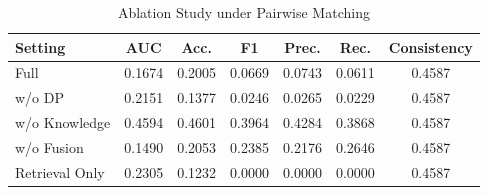 \begin{table}[t]
\centering
\small
\caption{Ablation Study under Pairwise Matching}
\label{tab:ablation_results}
\begin{tabular}{lcccccc}
\hline
Setting & AUC & Acc. & F1 & Prec. & Rec. & Consistency \\
\hline
Full & 0.1674 & 0.2005 & 0.0669 & 0.0743 & 0.0611 & 0.4587 \\
w/o DP & 0.2151 & 0.1377 & 0.0246 & 0.0265 & 0.0229 & 0.4587 \\
w/o Knowledge & 0.4594 & 0.4601 & 0.3964 & 0.4284 & 0.3868 & 0.4587 \\
w/o Fusion & 0.1490 & 0.2053 & 0.2385 & 0.2176 & 0.2646 & 0.4587 \\
Retrieval Only & 0.2305 & 0.1232 & 0.0000 & 0.0000 & 0.0000 & 0.4587 \\
\hline
\end{tabular}
\end{table}

